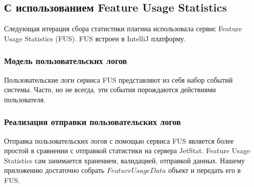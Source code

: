 \documentclass[times]{itmo-student-thesis}
\begin{document}
\subsection{С использованием Feature Usage Statistics}
Следующая итерация сбора статистики плагина использовала сервис Feature Usage Statistics (FUS). FUS встроен в IntelliJ платформу.
\subsubsection{Модель пользовательских логов}
Пользовательские логи сервиса FUS представляют из себя набор событий системы. Часто, но не всегда, эти события порождаются действиями пользователя.
\subsubsection{Реализация отправки пользовательских логов}
Отправка пользовательских логов с помощью сервиса FUS является более простой в сравнении с отправкой статистики на сервера JetStat. Feature Usage Statistics сам занимается хранением, валидацией, отправкой данных. Нашему приложению достаточно собрать $FeatureUsageData$ объект и передать его в FUS.
\printmainbibliography
\end{document}
